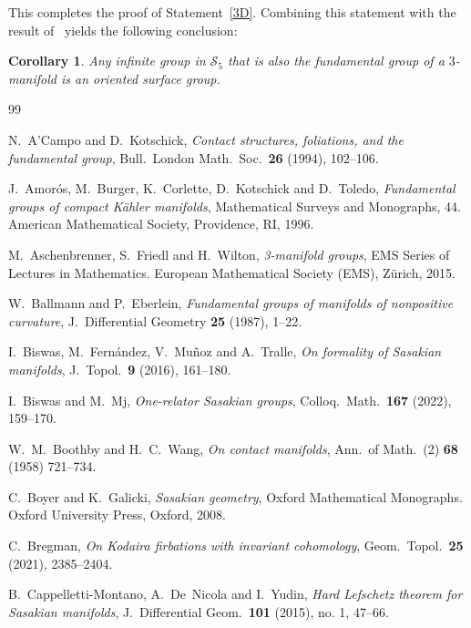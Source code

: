 \documentclass[12pt,leqno]{amsart}
\newcommand{\Sg}{\mathcal{S}}
\newtheorem{cor}[theor]{Corollary}
\begin{document}
This completes the proof of Statement~\ref{3D}. Combining this statement with the result of~\cite{Kot3}
yields the following conclusion:
\begin{cor}
Any infinite group in $\Sg_5$ that is also the fundamental group of a $3$-manifold is an oriented surface group.
\end{cor}






\begin{thebibliography}{99}

N.~A'Campo and D.~Kotschick, \emph{Contact structures, foliations, and the fundamental group},
Bull.~London Math.~Soc.~{\bf 26} (1994), 102--106.

J.~Amor\'os, M.~Burger, K.~Corlette, D.~Kotschick and D.~Toledo,
{\sl Fundamental groups of compact K\"ahler manifolds},
Mathematical Surveys and Monographs, 44. American Mathematical Society, Providence, RI, 1996.


M.~Aschenbrenner, S.~Friedl and H.~Wilton,
{\sl 3-manifold groups},
EMS Series of Lectures in Mathematics. European Mathematical Society (EMS), Z\"urich, 2015.


W.~Ballmann and P.~Eberlein, {\em Fundamental groups of manifolds of nonpositive curvature}, 
J.~Differential Geometry {\bf 25} (1987), 1--22.

I.~Biswas, M.~Fern\'andez, V.~Mu\~noz and A.~Tralle, \emph{On formality of Sasakian manifolds},
J.~Topol.~{\bf 9} (2016), 161--180.

I.~Biswas and M.~Mj, \emph{One-relator Sasakian groups}, Colloq.~Math.~{\bf 167} (2022), 159--170.


 W.~M.~Boothby and H.~C.~Wang,
 \emph{On contact manifolds},
 Ann.~of Math.~(2) {\bf 68} (1958) 721--734. 
  

 C.~Boyer and K.~Galicki,
{\sl Sasakian geometry},
 Oxford Mathematical Monographs. Oxford University Press, Oxford, 2008.


C.~Bregman, \emph{On Kodaira firbations with invariant cohomology}, Geom.~Topol.~{\bf 25} (2021), 2385--2404.



 B.~Cappelletti-Montano, A.~De~Nicola and I.~Yudin,
 \emph{Hard {L}efschetz theorem for {S}asakian manifolds},
 J.~Differential Geom.~{\bf 101} (2015), no. 1, 47--66. 
 

\end{thebibliography}
\end{document}
